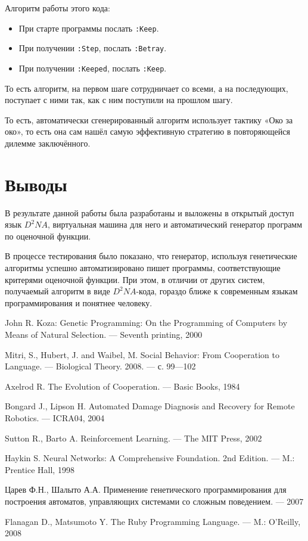 \documentclass[utf8,a5paper,portrait,10pt,twoside]{eskdtext}
\begin{document}
\newpage
Алгоритм работы этого кода:
\begin{itemize}
  \item При старте программы послать \texttt{:Keep}.
  \item При получении \texttt{:Step}, послать \texttt{:Betray}.
  \item При получении \texttt{:Keeped}, послать \texttt{:Keep}.
\end{itemize}

То есть алгоритм, на первом шаге сотрудничает со всеми, а на последующих,
поступает с ними так, как с ним поступили на прошлом шагу.

То есть, автоматически сгенерированный алгоритм использует тактику «Око за око»,
то есть она сам нашёл самую эффективную стратегию в повторяющейся дилемме
заключённого.

\newpage
\section{Выводы}

В результате данной работы была разработаны и выложены в открытый доступ язык
$D^2NA$, виртуальная машина для него и автоматический генератор программ по
оценочной функции.

В процессе тестирования было показано, что генератор, используя генетические
алгоритмы успешно автоматизировано пишет программы, соответствующие критерями
оценочной функции. При этом, в отличии от других систем, получаемый алгоритм
в виде $D^2NA$-кода, гораздо ближе к современным языкам программирования и
понятнее человеку.

\newpage
\begin{thebibliography}{}

    John R. Koza: Genetic Programming: On the Programming of Computers by Means
    of Natural Selection. — Seventh printing, 2000

    Mitri, S., Hubert, J. and Waibel, M. Social Behavior: From Cooperation to
    Language. — Biological Theory. 2008. — с. 99—102

    Axelrod R. The Evolution of Cooperation. — Basic Books, 1984

    Bongard J., Lipson H. Automated Damage Diagnosis and Recovery for Remote
    Robotics. — ICRA04, 2004

    Sutton R., Barto A. Reinforcement Learning. — The MIT Press, 2002

    Haykin S. Neural Networks: A Comprehensive Foundation. 2nd Edition. — M.: Prentice Hall, 1998

    Царев Ф.Н., Шалыто А.А. Применение генетического программирования для
    построения автоматов, управляющих системами со сложным поведением. — 2007
  
      Flanagan D., Matsumoto Y. The Ruby Programming Language. — M.: O'Reilly, 2008

\end{thebibliography}
\end{document}
